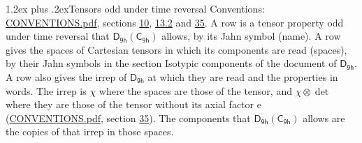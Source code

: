 \documentclass[10pt,a4paper]{article}
\makeatletter
\renewcommand\section{\@startsection{section}{1}{\z@}{-3ex plus -1ex minus -.2ex}%
  {1.2ex plus .2ex}{\normalfont\large\sffamily\bfseries\color{parttitle}}}
\numberwithin{equation}{section}
\newcommand{\grp}[1]{\mathsf{#1}}
\newcommand{\irrprod}{\otimes}
\makeatother
\begin{document}
\section{Tensors odd under time reversal}\label{s:time_odd}
Conventions: \href{../../CONVENTIONS.pdf}{CONVENTIONS.pdf}, sections \href{../../../rotation/CONVENTIONS.pdf\#conv.10}{10}, \href{../../../rotation/CONVENTIONS.pdf\#conv.13.2}{13.2} and \href{../../CONVENTIONS.pdf\#conv.35}{35}.
\leavevmode\label{n:head.name.property}A row is a tensor property odd under time reversal that $\grp{D_{9h}}(\grp{C_{9h}})$ allows, by its Jahn symbol (name). \label{n:head.spaces}A row gives the spaces of Cartesian tensors in which its components are read (spaces), by their Jahn symbols in the section Isotypic components of the document of \href{../../../rotation/data/pdf/D9h.pdf}{$\grp{D_{9h}}$}. \label{n:head.properties}A row also gives the irrep of $\grp{D_{9h}}$ at which they are read and the properties in words. The irrep is $\chi$ where the spaces are those of the tensor, and $\chi \irrprod \det$ where they are those of the tensor without its axial factor e (\href{../../CONVENTIONS.pdf}{CONVENTIONS.pdf}, section \href{../../CONVENTIONS.pdf\#conv.35}{35}). The components that $\grp{D_{9h}}(\grp{C_{9h}})$ allows are the copies of that irrep in those spaces.
\end{document}
